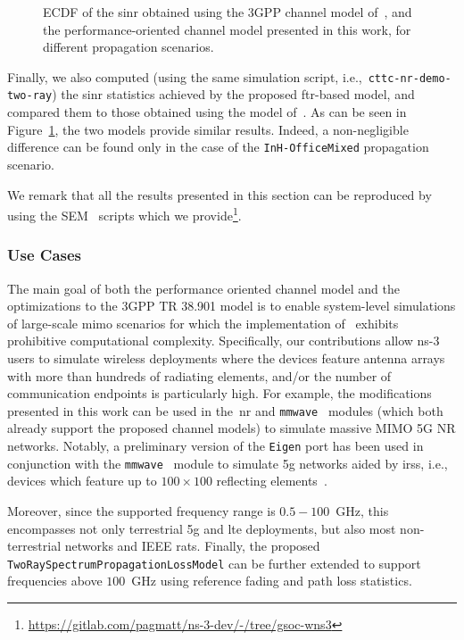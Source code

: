 \begin{figure}
    \centering 
    \setlength{}
    \setlength{}
    
    \caption{ECDF of the \gls{sinr} obtained using the 3GPP channel model of~\cite{TR38901}, and the performance-oriented channel model presented in this work, for different propagation scenarios.}
    \label{fig:accuracy}
\end{figure}

Finally, we also computed (using the same simulation script, i.e.,~\texttt{cttc-\-nr-\-demo-\-two-\-ray}) the \gls{sinr} statistics achieved by the proposed \gls{ftr}-based model, and compared them to those obtained using the model of~\cite{tommaso:20}. As can be seen in Figure~\ref{fig:accuracy}, the two models provide similar results. Indeed, a non-negligible difference can be found only in the case of the \texttt{InH-OfficeMixed} propagation scenario.

We remark that all the results presented in this section can be reproduced by using the SEM~\cite{magrin2019simulation} scripts which we provide\footnote{\url{https://gitlab.com/pagmatt/ns-3-dev/-/tree/gsoc-wns3}}.

\subsubsection{Use Cases}

The main goal of both the performance oriented channel model and the optimizations to the 3GPP TR 38.901 model is to enable system-level
simulations of large-scale \gls{mimo} scenarios for which the implementation of~\cite{tommaso:20} exhibits prohibitive computational complexity. Specifically, our contributions allow ns-3 users to simulate wireless deployments where the devices feature antenna arrays with more than hundreds of radiating elements, and/or the number of communication endpoints is particularly high. For example, the modifications presented in this work can be used in the~\gls{nr} and \texttt{mmwave}~\cite{mezzavilla2018end} modules (which both already support the proposed channel models) to simulate massive MIMO 5G NR networks. 
Notably, a preliminary version of the \texttt{Eigen} port has been used in conjunction with the \texttt{mmwave}~\cite{mezzavilla2018end} module to simulate \gls{5g} networks aided by \glspl{irs}, i.e., devices which feature up to $100 \times 100$ reflecting elements~\cite{pagin2022}. 

Moreover, since the supported frequency range is $0.5 - 100$~GHz, this encompasses not only terrestrial \gls{5g} and \gls{lte} deployments, but also most non-terrestrial networks and IEEE \glspl{rat}. Finally, the proposed \texttt{Two\-Ray\-Spectrum\-Propagation\-Loss\-Model} can be further extended to support frequencies above $100$~GHz using reference fading and path loss statistics.


